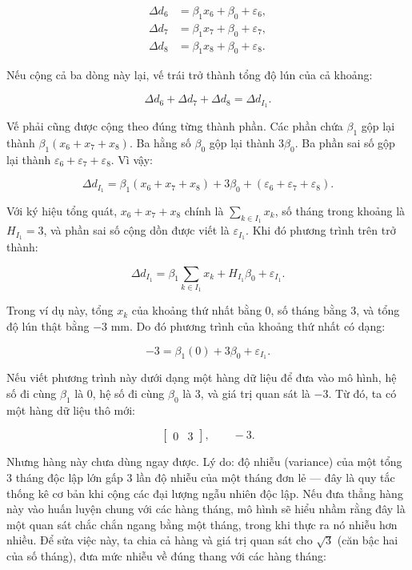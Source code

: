 \documentclass[12pt]{article}
\begin{document}
\[
\begin{aligned}
\Delta d_{6} &= \beta_1 x_6+\beta_0+\varepsilon_6,\\
\Delta d_{7} &= \beta_1 x_7+\beta_0+\varepsilon_7,\\
\Delta d_{8} &= \beta_1 x_8+\beta_0+\varepsilon_8.
\end{aligned}
\]

Nếu cộng cả ba dòng này lại, vế trái trở thành tổng độ lún của cả khoảng:

\[
\Delta d_{6}+\Delta d_{7}+\Delta d_{8}
=
\Delta d_{I_1}.
\]

Vế phải cũng được cộng theo đúng từng thành phần. Các phần chứa $\beta_1$ gộp lại thành $\beta_1(x_6+x_7+x_8)$. Ba hằng số $\beta_0$ gộp lại thành $3\beta_0$. Ba phần sai số gộp lại thành $\varepsilon_6+\varepsilon_7+\varepsilon_8$. Vì vậy:

\[
\Delta d_{I_1}
=
\beta_1(x_6+x_7+x_8)
+
3\beta_0
+
(\varepsilon_6+\varepsilon_7+\varepsilon_8).
\]

Với ký hiệu tổng quát, $x_6+x_7+x_8$ chính là $\sum_{k\in I_1}x_k$, số tháng trong khoảng là $H_{I_1}=3$, và phần sai số cộng dồn được viết là $\varepsilon_{I_1}$. Khi đó phương trình trên trở thành:

\[
\Delta d_{I_1}
=
\beta_1
\sum_{k\in I_1}x_k
+
H_{I_1}\beta_0
+
\varepsilon_{I_1}.
\]

Trong ví dụ này, tổng $x_k$ của khoảng thứ nhất bằng 0, số tháng bằng 3, và tổng độ lún thật bằng $-3$ mm. Do đó phương trình của khoảng thứ nhất có dạng:

\[
-3
=
\beta_1(0)
+
3\beta_0
+
\varepsilon_{I_1}.
\]

Nếu viết phương trình này dưới dạng một hàng dữ liệu để đưa vào mô hình, hệ số đi cùng $\beta_1$ là 0, hệ số đi cùng $\beta_0$ là 3, và giá trị quan sát là $-3$. Từ đó, ta có một hàng dữ liệu thô mới:

\[
\begin{bmatrix}
0 & 3
\end{bmatrix},
\qquad
-3.
\]

Nhưng hàng này chưa dùng ngay được. Lý do: độ nhiễu (variance) của một tổng 3 tháng độc lập lớn gấp 3 lần độ nhiễu của một tháng đơn lẻ — đây là quy tắc thống kê cơ bản khi cộng các đại lượng ngẫu nhiên độc lập. Nếu đưa thẳng hàng này vào huấn luyện chung với các hàng tháng, mô hình sẽ hiểu nhầm rằng đây là một quan sát chắc chắn ngang bằng một tháng, trong khi thực ra nó nhiễu hơn nhiều. Để sửa việc này, ta chia cả hàng và giá trị quan sát cho $\sqrt{3}$ (căn bậc hai của số tháng), đưa mức nhiễu về đúng thang với các hàng tháng:
\end{document}
